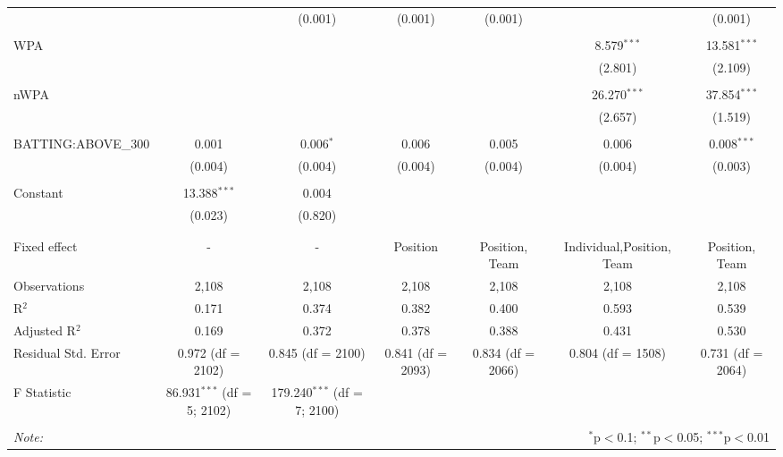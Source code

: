\begin{table}[!htbp]
\begin{tabular}{@{\extracolsep{5pt}}lcccccc}
  &  & (0.001) & (0.001) & (0.001) &  & (0.001) \\
  & & & & & & \\
 WPA &  &  &  &  & 8.579$^{***}$ & 13.581$^{***}$ \\
  &  &  &  &  & (2.801) & (2.109) \\
  & & & & & & \\
 nWPA &  &  &  &  & 26.270$^{***}$ & 37.854$^{***}$ \\
  &  &  &  &  & (2.657) & (1.519) \\
  & & & & & & \\
 BATTING:ABOVE\_300 & 0.001 & 0.006$^{*}$ & 0.006 & 0.005 & 0.006 & 0.008$^{***}$ \\
  & (0.004) & (0.004) & (0.004) & (0.004) & (0.004) & (0.003) \\
  & & & & & & \\
 Constant & 13.388$^{***}$ & 0.004 &  &  &  &  \\
  & (0.023) & (0.820) &  &  &  &  \\
  & & & & & & \\
\hline \\[-1.8ex]
Fixed effect & - & - & Position & Position, Team & Individual,Position, Team & Position, Team \\
Observations & 2,108 & 2,108 & 2,108 & 2,108 & 2,108 & 2,108 \\
R$^{2}$ & 0.171 & 0.374 & 0.382 & 0.400 & 0.593 & 0.539 \\
Adjusted R$^{2}$ & 0.169 & 0.372 & 0.378 & 0.388 & 0.431 & 0.530 \\
Residual Std. Error & 0.972 (df = 2102) & 0.845 (df = 2100) & 0.841 (df = 2093) & 0.834 (df = 2066) & 0.804 (df = 1508) & 0.731 (df = 2064) \\
F Statistic & 86.931$^{***}$ (df = 5; 2102) & 179.240$^{***}$ (df = 7; 2100) &  &  &  &  \\
\hline
\hline \\[-1.8ex]
\textit{Note:}  & \multicolumn{6}{r}{$^{*}$p$<$0.1; $^{**}$p$<$0.05; $^{***}$p$<$0.01} \\
\end{tabular}
\end{table}
